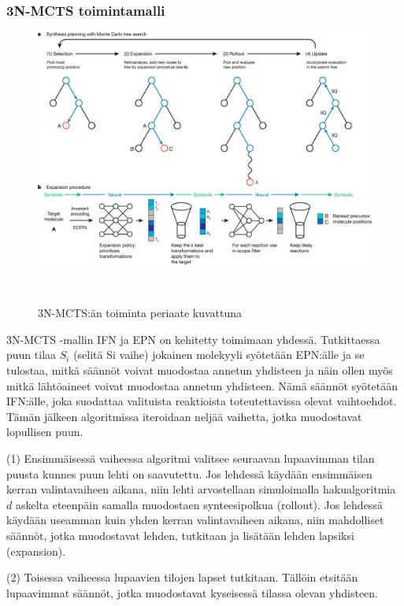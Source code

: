 \documentclass[finnish,twoside,censored,tkt,sw-line]{HYthesisML}
\begin{document}
\subsubsection{3N-MCTS toimintamalli}

\begin{figure}
    \centering
    \includegraphics[width=\textwidth]{3N-MCTS-fig.jpg}
    \caption{3N-MCTS:än toiminta periaate kuvattuna}
    {~\cite{SeglerMarwinHS2018Pcsw}}
\end{figure}

3N-MCTS -mallin IFN ja EPN on kehitetty toimimaan yhdessä.
Tutkittaessa puun tilaa \(S_i\) (selitä Si vaihe) jokainen molekyyli syötetään EPN:älle ja se tulostaa, mitkä säännöt voivat muodostaa annetun yhdisteen ja näin ollen myös mitkä lähtöaineet voivat muodostaa annetun yhdisteen.
Nämä säännöt syötetään IFN:älle, joka suodattaa valituista reaktioista toteutettavissa olevat vaihtoehdot.
Tämän jälkeen algoritmissa iteroidaan neljää vaihetta, jotka muodostavat lopullisen puun.

(1) Ensimmäisessä vaiheessa algoritmi valitsee seuraavan lupaavimman tilan puusta kunnes puun lehti on saavutettu.
Jos lehdessä käydään ensimmäisen kerran valintavaiheen aikana, niin lehti arvostellaan simuloimalla hakualgoritmia \(d\) askelta eteenpäin samalla muodostaen synteesipolkua (rollout).
Jos lehdessä käydään useamman kuin yhden kerran valintavaiheen aikana, niin mahdolliset säännöt, jotka muodostavat lehden, tutkitaan ja lisätään lehden lapsiksi (expansion).

(2) Toisessa vaiheessa lupaavien tilojen lapset tutkitaan.
Tällöin etsitään lupaavimmat säännöt, jotka muodostavat kyseisessä tilassa olevan yhdisteen.
\end{document}
